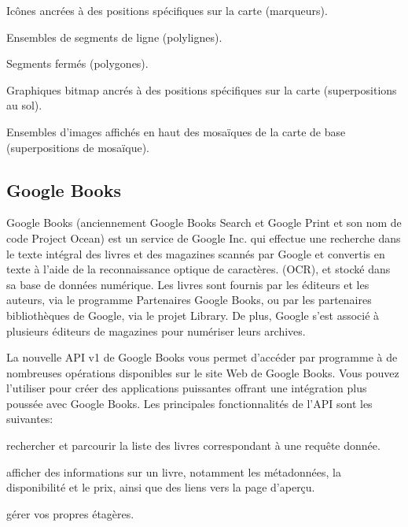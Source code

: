 \begin{list}{•}{}
\item Icônes ancrées à des positions spécifiques sur la carte (marqueurs).
\item Ensembles de segments de ligne (polylignes).
\item Segments fermés (polygones).
\item Graphiques bitmap ancrés à des positions spécifiques sur la carte (superpositions au sol).
\item Ensembles d'images affichés en haut des mosaïques de la carte de base (superpositions de mosaïque).
\end{list}

\subsection{Google Books}
Google Books (anciennement Google Books Search et Google Print et son nom de code Project Ocean) est un service de Google Inc. qui effectue une recherche dans le texte intégral des livres et des magazines scannés par Google et convertis en texte à l'aide de la reconnaissance optique de caractères. (OCR), et stocké dans sa base de données numérique. Les livres sont fournis par les éditeurs et les auteurs, via le programme Partenaires Google Books, ou par les partenaires bibliothèques de Google, via le projet Library. De plus, Google s'est associé à plusieurs éditeurs de magazines pour numériser leurs archives.\cite{noauthor_google_nodate}

La nouvelle API v1 de Google Books vous permet d'accéder par programme à de nombreuses opérations disponibles sur le site Web de Google Books. Vous pouvez l'utiliser pour créer des applications puissantes offrant une intégration plus poussée avec Google Books. Les principales fonctionnalités de l'API sont les suivantes:

\begin{list}{•}{}
\item rechercher et parcourir la liste des livres correspondant à une requête donnée.
\item afficher des informations sur un livre, notamment les métadonnées, la disponibilité et le prix, ainsi que des liens vers la page d'aperçu.
\item gérer vos propres étagères.
\end{list}